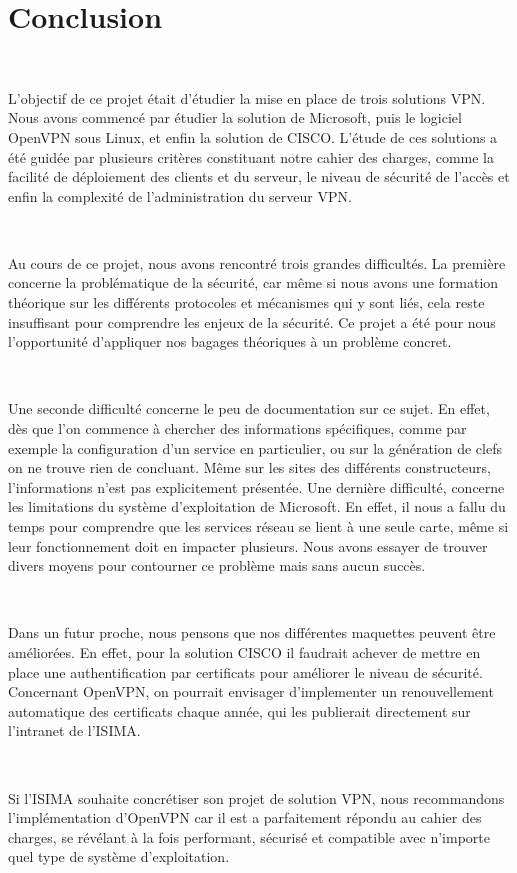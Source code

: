 \section*{Conclusion}

~

L'objectif de ce projet était d'étudier la mise en place de trois solutions VPN. Nous avons commencé par étudier la solution de Microsoft, puis le logiciel OpenVPN sous Linux, et enfin la solution de CISCO. L'étude de ces solutions a été guidée par plusieurs critères constituant notre cahier des charges, comme la facilité de déploiement des clients et du serveur, le niveau de sécurité de l'accès et enfin la complexité de l'administration du serveur VPN.

~

Au cours de ce projet, nous avons rencontré trois grandes difficultés. La première concerne la problématique de la sécurité, car même si nous avons une formation théorique sur les différents protocoles et mécanismes qui y sont liés, cela reste insuffisant pour comprendre les enjeux de la sécurité. Ce projet a été pour nous l'opportunité d'appliquer nos bagages théoriques à un problème concret.

~

Une seconde difficulté concerne le peu de documentation sur ce sujet. En effet, dès que l'on commence à chercher des informations spécifiques, comme par exemple la configuration d'un service en particulier, ou sur la génération de clefs on ne trouve rien de concluant. Même sur les sites des différents constructeurs, l'informations n'est pas explicitement présentée.
Une dernière difficulté, concerne les limitations du système d'exploitation de Microsoft. En effet, il nous a fallu du temps pour comprendre que les services réseau se lient à une seule carte, même si leur fonctionnement doit en impacter plusieurs. Nous avons essayer de trouver divers moyens pour contourner ce problème mais sans aucun succès.

~

Dans un futur proche, nous pensons que nos différentes maquettes peuvent être améliorées. En effet, pour la solution CISCO il faudrait achever de mettre en place une authentification par certificats pour améliorer le niveau de sécurité. Concernant OpenVPN, on pourrait envisager d'implementer un renouvellement automatique des certificats chaque année, qui les publierait directement sur l'intranet de l'ISIMA.

~

Si l'ISIMA souhaite concrétiser son projet de solution VPN, nous recommandons l'implémentation d'OpenVPN car il est a parfaitement répondu au cahier des charges, se révélant à la fois performant, sécurisé et compatible avec n'importe quel type de système d'exploitation.

\pagebreak
